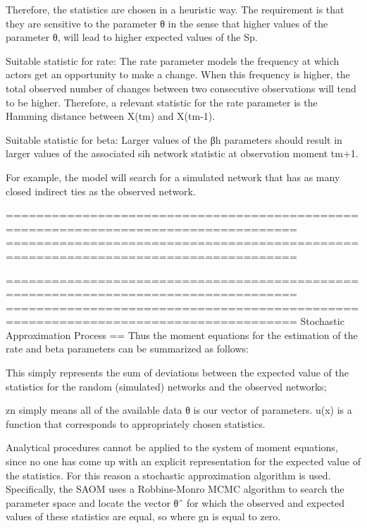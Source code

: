 Therefore, the statistics are chosen in a heuristic way. The requirement is that they are sensitive to the parameter θ in the sense that higher values of the parameter θ, will lead to higher expected values of the Sp.


Suitable statistic for rate:
The rate parameter models the frequency at which actors get an opportunity to make a change. When this frequency is higher, the total observed number of changes between two consecutive observations will tend to be higher. Therefore, a relevant statistic for the rate parameter is the Hamming distance between X(tm) and X(tm-1). 

Suitable statistic for beta:
Larger values of the βh parameters should result in larger values of the associated sih network statistic at observation moment tm+1. 

For example, the model will search for a simulated network that has as many closed indirect ties as the observed network.

====================================================================================
====================================================================================

====================================================================================
====================================================================================
Stochastic Approximation Process
==
Thus the moment equations for the estimation of the rate and beta parameters can be summarized as follows: 

This simply represents the sum of deviations between the expected value of the statistics for the random (simulated) networks and the observed networks; 

	zn simply means all of the available data
	θ is our vector of parameters. 
	u(x) is a function that corresponds to appropriately chosen statistics. 

Analytical procedures cannot be applied to the system of moment equations, since no one has come up with an explicit representation for the expected value of the statistics. For this reason a stochastic approximation algorithm is used. Specifically, the SAOM uses a Robbins-Monro MCMC algorithm to search the parameter space and locate the vector θˆ for which the observed and expected values of these statistics are equal, so where gn is equal to zero. 

